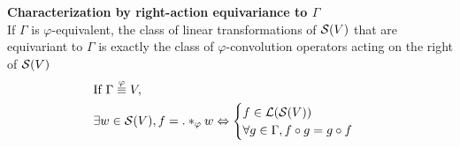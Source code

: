 \begin{theorem}\textbf{Characterization by right-action equivariance to $\Gamma$}\\
If $\Gamma$ is $\varphi$-equivalent, the class of linear transformations of $\mathcal{S}(V)$ that are equivariant to $\Gamma$ is exactly the class of $\varphi$-convolution operators acting on the right of $\mathcal{S}(V)$ \ie
\begin{align*}
& \text{If } \Gamma \overset{\varphi}{\equiv} V,\\
& \exists w \in \mathcal{S}(V), f = . \ast_{\varphi} w \Leftrightarrow
\begin{cases}
f \in \mathcal{L}(\mathcal{S}(V))\\
\forall g \in \Gamma, f \circ g = g \circ f
\end{cases}
\end{align*}
\label{prop:equiG}
\end{theorem}

